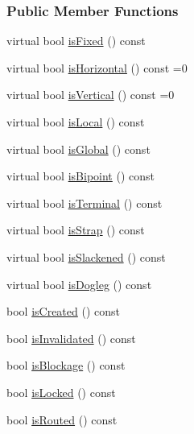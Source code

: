\subsubsection*{Public Member Functions}
\begin{DoxyCompactItemize}
\item 
virtual bool \hyperlink{classKite_1_1TrackElement_af5e7d3badddf2ec07159f1d83426d4c1}{is\-Fixed} () const 
\item 
virtual bool \hyperlink{classKite_1_1TrackElement_a9d3db1f8a5aca58f8f54d291faebf873}{is\-Horizontal} () const =0
\item 
virtual bool \hyperlink{classKite_1_1TrackElement_a6fa2bf0568a2b295dd7cd1f7207247d5}{is\-Vertical} () const =0
\item 
virtual bool \hyperlink{classKite_1_1TrackElement_a69fb7e260ed2bc6fa82bfe12c2aeec5a}{is\-Local} () const 
\item 
virtual bool \hyperlink{classKite_1_1TrackElement_a017b1ead8e5988dd0e491cae93ac510c}{is\-Global} () const 
\item 
virtual bool \hyperlink{classKite_1_1TrackElement_ab5035e6d84cf3ec7b519a5acb109efaa}{is\-Bipoint} () const 
\item 
virtual bool \hyperlink{classKite_1_1TrackElement_a8d6f4521b27f32080d7477cf8ee8a274}{is\-Terminal} () const 
\item 
virtual bool \hyperlink{classKite_1_1TrackElement_a4721fcbe9c93ed5392afd9a756b989a8}{is\-Strap} () const 
\item 
virtual bool \hyperlink{classKite_1_1TrackElement_ab1f9e0bca70dea59558459a003a62d88}{is\-Slackened} () const 
\item 
virtual bool \hyperlink{classKite_1_1TrackElement_a172b2394f9c2cbaaf5bc4b19e0e76e65}{is\-Dogleg} () const 
\item 
bool \hyperlink{classKite_1_1TrackElement_a6a7e35dd5a9ca99ca879e424ce42b902}{is\-Created} () const 
\item 
bool \hyperlink{classKite_1_1TrackElement_a54f713d06c43bebf4e0dfef06e347531}{is\-Invalidated} () const 
\item 
bool \hyperlink{classKite_1_1TrackElement_a1dbaf905a283e4e45ac71c4771e9e644}{is\-Blockage} () const 
\item 
bool \hyperlink{classKite_1_1TrackElement_ae0c9fa9daf2467984aea571a0f3940c6}{is\-Locked} () const 
\item 
bool \hyperlink{classKite_1_1TrackElement_ae7adbfe4ada0ac46f8cd9cc8f296327d}{is\-Routed} () const 
\item 

\end{DoxyCompactItemize}
